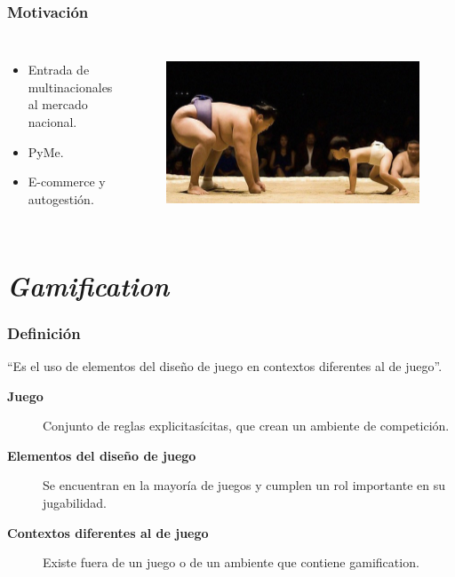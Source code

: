 \documentclass[10pt, compress]{beamer}
\begin{document}
\begin{frame}[fragile]
  \frametitle{Motivación}
\begin{columns}[onlytextwidth]
\begin{itemize}
\item Entrada de multinacionales \\
al mercado nacional.
\item PyMe. 
\item E-commerce y autogestión.
\end{itemize}

\begin{figure}
\centering
    \includegraphics[width=1\textwidth]{images/pymes.jpg}
    \label{fig:awesom_image}
\end{figure}
\end{columns}
\end{frame}

\section{\emph{Gamification}}

\begin{frame}[fragile]
  \frametitle{Definición}
     ``Es el uso de elementos del diseño de juego en contextos diferentes al de juego''.

\begin{description}
 \item[\textbf{Juego}] Conjunto de reglas explicitasícitas, que crean un ambiente de competición.
 \item[\textbf{Elementos del diseño de juego}] Se encuentran en la mayoría de juegos y cumplen un rol importante 
en su jugabilidad.
 \item[\textbf{Contextos diferentes al de juego}] Existe fuera de un juego o de un ambiente que contiene gamification.
\end{description}
\end{frame}
\end{document}
